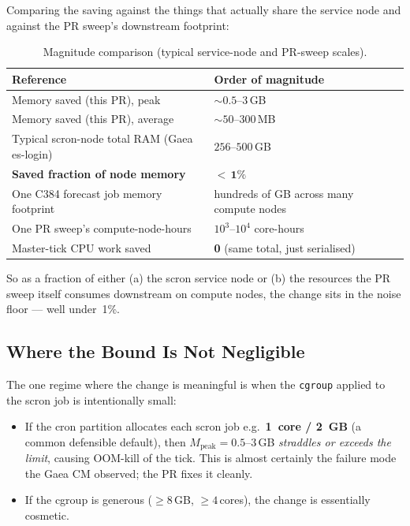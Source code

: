\documentclass[11pt]{article}
\newcommand{\code}[1]{\texttt{#1}}
\begin{document}
Comparing the saving against the things that actually share the
service node and against the PR sweep's downstream footprint:

\begin{table}[h]
\centering
\caption{Magnitude comparison (typical service-node and PR-sweep scales).}
\label{tab:magnitude}
\begin{tabular}{ll}
\toprule
Reference & Order of magnitude \\
\midrule
Memory saved (this PR), peak                 & $\sim 0.5\text{--}3$\,GB \\
Memory saved (this PR), average              & $\sim 50\text{--}300$\,MB \\
Typical scron-node total RAM (Gaea es-login) & $256\text{--}500$\,GB \\
\textbf{Saved fraction of node memory}       & $\boldsymbol{<\,1\%}$ \\
\midrule
One C384 forecast job memory footprint       & hundreds of GB
                                                across many compute nodes \\
One PR sweep's compute-node-hours            & $10^{3}\text{--}10^{4}$
                                                core-hours \\
Master-tick CPU work saved                   & \textbf{0}
                                                (same total, just serialised) \\
\bottomrule
\end{tabular}
\end{table}

So as a fraction of either (a) the scron service node or (b) the
resources the PR sweep itself consumes downstream on compute nodes,
the change sits in the noise floor --- well under~1\%.

\subsection{Where the Bound Is Not Negligible}

The one regime where the change is meaningful is when the
\code{cgroup} applied to the scron job is intentionally small:

\begin{itemize}[leftmargin=*]
  \item If the cron partition allocates each scron job e.g.\
        \textbf{1~core / 2~GB} (a common defensible default), then
        $M_\text{peak} = 0.5\text{--}3$\,GB \emph{straddles or exceeds the
        limit}, causing OOM-kill of the tick. This is almost
        certainly the failure mode the Gaea CM observed; the PR fixes
        it cleanly.
  \item If the cgroup is generous ($\geq 8$\,GB, $\geq 4$\,cores),
        the change is essentially cosmetic.
\end{itemize}
\end{document}
